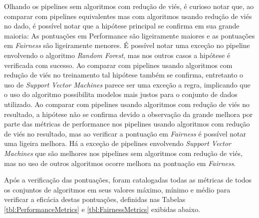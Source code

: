 \documentclass[portugues]{ic-tese}
\begin{document}
Olhando os pipelines sem algoritmos com redução de viés, é curioso notar que, ao comparar com pipelines equivalentes mas com algoritmos usando redução de viés no dado, é possível notar que a hipótese principal se confirma em sua grande maioria: As pontuações em Performance são ligeiramente maiores e as pontuações em \textit{Fairness} são ligeiramente menores. É possível notar uma exceção no pipeline envolvendo o algoritmo \textit{Random Forest}, mas nos outros casos a hipótese é verificada com sucesso. Ao comparar com pipelines usando algoritmos com redução de viés no treinamento tal hipótese também se confirma, entretanto o uso de \textit{Support Vector Machines} parece ser uma exceção a regra, implicando que o uso do algoritmo possibilita modelos mais justos para o conjunto de dados utilizado. Ao comparar com pipelines usando algoritmos com redução de viés no resultado, a hipótese não se confirma devido a observação da grande melhora por parte das métricas de performance nos pipelines usando algoritmos com redução de viés no resultado, mas ao verificar a pontuação em \textit{Fairness} é possível notar uma ligeira melhora. Há a exceção de pipelines envolvendo \textit{Support Vector Machines} que são melhores nos pipelines sem algoritmos com redução de viés, mas no uso de outros algoritmos ocorre melhora na pontuação em \textit{Fairness}.

Após a verificação das pontuações, foram catalogadas todas as métricas de todos os conjuntos de algoritmos em seus valores máximo, mínimo e médio para verificar a eficácia destas pontuações, definidas nas Tabelas \ref{tbl:PerformanceMetrics} e \ref{tbl:FairnessMetrics} exibidas abaixo.
\end{document}
